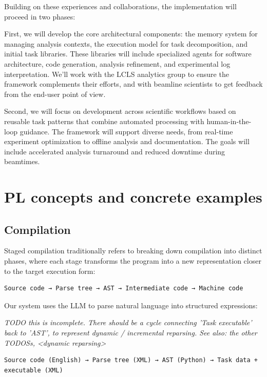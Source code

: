 \documentclass{article}
\begin{document}
Building on these experiences and collaborations, the implementation will proceed in two phases:

First, we will develop the core architectural components: the memory system for managing analysis contexts, the execution model for task decomposition, and initial task libraries. These libraries will include specialized agents for software architecture, code generation, analysis refinement, and experimental log interpretation. We'll work with the LCLS analytics group to ensure the framework complements their efforts, and with beamline scientists to get feedback from the end-user point of view.

Second, we will focus on development across scientific workflows based on reusable task patterns that combine automated processing with human-in-the-loop guidance. The framework will support diverse needs, from real-time experiment optimization to offline analysis and documentation. The goals will include accelerated analysis turnaround and reduced downtime during beamtimes.

\section{PL concepts and concrete examples}
\subsection{Compilation}

Staged compilation traditionally refers to breaking down compilation into distinct phases, where each stage transforms the program into a new representation closer to the target execution form:

\begin{verbatim}
Source code → Parse tree → AST → Intermediate code → Machine code
\end{verbatim}





Our system uses the LLM to parse natural language into structured expressions:

\emph{TODO this is incomplete. There should be a cycle connecting 'Task executable' back to 
'AST', to represent dynamic / incremental reparsing. See also: the other TODOSs, <dynamic reparsing>}
\begin{verbatim}
Source code (English) → Parse tree (XML) → AST (Python) → Task data + executable (XML) 
\end{verbatim}
\end{document}

